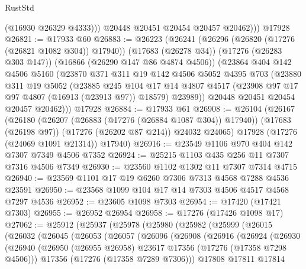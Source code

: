 \begin{lexlean}{RustStd}
\begin{coremodule}
              (@16930 @26329 @4333)))
          @20448
          @20451
          @20454
          @20457
          @20462)))
    @17928
@26821 := @17933 @60
@26883 := @26223
    (@26241
      (@26296 (@26820 (@17276 (@26821 @1082 @304)) @17940))
      (@17683 (@26278 @34))
      (@17276 (@26283 @303 @147))
      (@16866 (@26290 @147 @86 @4874 @4506))
      (@23864
        @404
        @142
        @4506
        @5160
        (@23870
          @371
          @311
          @19
          @142
          @4506
          @5052
          @4395
          @703
          (@23880
            @311
            @19
            @5052
            (@23885
              @245
              @104
              @17
              @14
              @4807
              @4517
              (@23908 @97 @17 @97 @4807 (@16913 (@23913 @97)) @18579)
              @23989))
          @20448
          @20451
          @20454
          @20457
          @20462)))
    @17928
@26884 := @17933 @61
@26908 := @26104
    (@26167
      (@26180
        (@26207 (@26883 (@17276 (@26884 @1087 @304)) @17940))
        (@17683 (@26198 @97))
        (@17276 (@26202 @87 @214))
        @24032
        @24065)
      @17928
      (@17276 (@24069 @1091 @21314))
      @17940)
@26916 := @23549 @1106 @970 @404 @142 @7307 @7349 @4506 @7352
@26924 := @25215 @1103 @435 @256 @11 @7307 @7316 @4506 @7349
@26930 := @23560 @1102 @1302 @11 @7307 @7314 @4715
@26940 := @23569 @1101 @17 @19 @6260 @7306 @7313 @4568 @7288 @4536 @23591
@26950 := @23568 @1099 @104 @17 @14 @7303 @4506 @4517 @4568 @7297 @4536
@26952 := @23605 @1098 @7303
@26954 := @17420 (@17421 @7303)
@26955 := @26952 @26954
@26958 := @17276 (@17426 @1098 @17)
@27062 := @25912
    (@25937
      (@25978
        (@25980
          (@25982
            (@25999
              (@26015
                (@26032
                  (@26045
                    (@26053
                      (@26057
                        (@26096
                          (@26908
                            (@26916
                              (@26924
                                (@26930
                                  (@26940
                                    (@26950
                                      (@26955 @26958)
                                      @23617
                                      @17356
                                      (@17276 (@17358 @7298 @4506)))
                                    @17356
                                    (@17276 (@17358 @7289 @7306)))
                                  @17808
                                  @17811
                                  @17814

\end{coremodule}
\end{lexlean}
